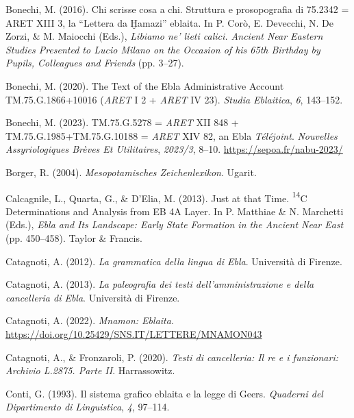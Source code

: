 \documentclass[
]{book}
\newlength{\cslhangindent}
\newlength{\cslentryspacingunit} %
\newenvironment{CSLReferences}[2] %
 {%
  \setlength{\parindent}{0pt}
  \ifodd #1
  \let\oldpar\par
  \def\par{\hangindent=\cslhangindent\oldpar}
  \fi
  \setlength{\parskip}{#2\cslentryspacingunit}
 }%
 {}
\begin{document}
\begin{CSLReferences}{1}{0}
\leavevmode{}%
Bonechi, M. (2016). Chi scrisse cosa a chi. Struttura e prosopografia di 75.2342 = ARET XIII 3, la {``Lettera da Ḫamazi''} eblaita. In P. Corò, E. Devecchi, N. De Zorzi, \& M. Maiocchi (Eds.), \emph{Libiamo ne' lieti calici. Ancient Near Eastern Studies Presented to Lucio Milano on the Occasion of his 65th Birthday by Pupils, Colleagues and Friends} (pp. 3--27).

\leavevmode{}%
Bonechi, M. (2020). The {Text} of the {Ebla Administrative Account TM}.75.{G}.1866+10016 ({\emph{ARET}} {I} 2 + {\emph{ARET}} {IV} 23). \emph{Studia Eblaitica}, \emph{6}, 143--152.

\leavevmode{}%
Bonechi, M. (2023). {TM}.75.{G}.5278 = {\emph{ARET}} {XII} 848 + {TM}.75.{G}.1985+{TM}.75.{G}.10188 = {\emph{ARET}} {XIV} 82, an {Ebla} {\emph{Téléjoint}}. \emph{Nouvelles Assyriologiques Brèves Et Utilitaires}, \emph{2023/3}, 8--10. \url{https://sepoa.fr/nabu-2023/}

\leavevmode{}%
Borger, R. (2004). \emph{Mesopotamisches Zeichenlexikon}. Ugarit.

\leavevmode{}%
Calcagnile, L., Quarta, G., \& D'Elia, M. (2013). Just at that {Time}. {\textsuperscript{14}}{C Determinations} and {Analysis} from {EB 4A Layer}. In P. Matthiae \& N. Marchetti (Eds.), \emph{Ebla and {Its Landscape}: {Early State Formation} in the {Ancient Near East}} (pp. 450--458). Taylor \& Francis.

\leavevmode{}%
Catagnoti, A. (2012). \emph{La grammatica della lingua di Ebla}. Università di Firenze.

\leavevmode{}%
Catagnoti, A. (2013). \emph{La paleografia dei testi dell'amministrazione e della cancelleria di Ebla}. Università di Firenze.

\leavevmode{}%
Catagnoti, A. (2022). \emph{Mnamon: {Eblaita}}. \url{https://doi.org/10.25429/SNS.IT/LETTERE/MNAMON043}

\leavevmode{}%
Catagnoti, A., \& Fronzaroli, P. (2020). \emph{Testi di cancelleria: Il re e i funzionari: Archivio L.2875. Parte II}. Harrassowitz.

\leavevmode{}%
Conti, G. (1993). Il sistema grafico eblaita e la legge di Geers. \emph{Quaderni del Dipartimento di Linguistica}, \emph{4}, 97--114.


\end{CSLReferences}
\end{document}
